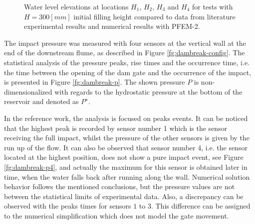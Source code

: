 \documentclass[a4paper,conference]{IEEEtran}
\begin{document}
\begin{figure}[H]
{    }
   \caption{Water level elevations at locations $H_1$, $H_2$, $H_3$ and $H_4$ for tests with $H=300[mm]$ initial filling height compared to data from literature experimental results\cite{Lobovsky13} and numerical results with PFEM-2.}
   \label{fg:dambreak-h}                %
\end{figure}

The impact pressure was measured with four sensors at the vertical wall at the end of the downstream flume, as described in Figure \ref{fg:dambreak-config}. The statistical analysis of the pressure peaks, rise times and the occurrence time, i.e. the time between
the opening of the dam gate and the occurrence of the impact, is presented in Figure \ref{fg:dambreak-p}. The shown pressure $P$ is non-dimensionalized with regards to the hydrostatic pressure at the bottom of the reservoir and denoted as $P^∗$. 

In the reference work, the analysis is focused on peaks events. It can be noticed that the highest peak is recorded by sensor number 1 which is the sensor receiving the full impact, whilst the pressure of the other sensors is given by the run up of the flow. It can also be observed that sensor number 4, i.e. the sensor located at the highest position, does not show a pure impact event, see Figure \ref{fg:dambreak-p4}, and actually the maximum for this sensor is obtained later in time, when the water falls back after running along the wall. Numerical solution behavior follows the mentioned conclusions, but the pressure values are not between the statistical limits of experimental data. Also, a discrepancy can be observed with the peaks times for sensors $1$ to $3$. This difference can be assigned to the numerical simplification which does not model the gate movement.
\end{document}
